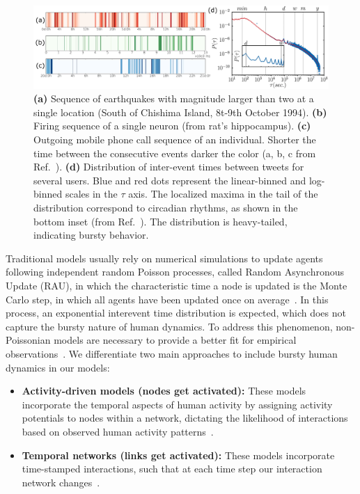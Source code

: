 \begin{figure}
    \centering
    \captionsetup{font=sf}
    \includegraphics[width=\textwidth]{Figs/Introduction/bursty.png}
    \caption[Bursty human dynamics: examples and distribution]{\textbf{(a)} Sequence of earthquakes with magnitude larger than two at a single location (South of Chishima Island, 8t-9th October 1994). \textbf{(b)} Firing sequence of a single neuron (from rat's hippocampus). \textbf{(c)} Outgoing mobile phone call sequence of an individual. Shorter the time between the consecutive events darker the color (a, b, c from Ref.~\cite{karsai2012universal}). \textbf{(d)} Distribution of inter-event times between tweets for several users. Blue and red dots represent the linear-binned and log-binned scales in the $\tau$ axis. The localized maxima in the tail of the distribution correspond to circadian rhythms, as shown in the bottom inset  (from Ref.~\cite{artime-2017}). The distribution is heavy-tailed, indicating bursty behavior.}
    \label{fig:bursty_human_dynamics}
\end{figure}

Traditional models usually rely on numerical simulations to update agents following independent random Poisson processes, called Random Asynchronous Update (RAU), in which the characteristic time a node is updated is the Monte Carlo step, in which all agents have been updated once on average~\cite{fernandez-gracia-2011}. In this process, an exponential interevent time distribution is expected, which does not capture the bursty nature of human dynamics. To address this phenomenon, non-Poissonian models are necessary to provide a better fit for empirical observations~\cite{Vazquez2006Bursts}. We differentiate two main approaches to include bursty human dynamics in our models:

\begin{itemize}
    \item \textbf{Activity-driven models (nodes get activated):} These models incorporate the temporal aspects of human activity by assigning activity potentials to nodes within a network, dictating the likelihood of interactions based on observed human activity patterns~\cite{stark-2008,van-mieghem-2013,starnini-2017}.
    \item \textbf{Temporal networks (links get activated):} These models incorporate time-stamped interactions, such that at each time step our interaction network changes~\cite{Holme2012Temporal, Perra2012ActivityDriven}.
\end{itemize}

